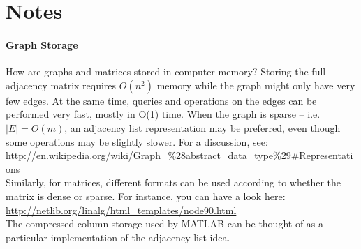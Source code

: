 \section{Notes}


\paragraph{Graph Storage} How are graphs and matrices stored in computer memory?
Storing the full adjacency matrix requires $O(n^2)$ memory while the graph might only have very few edges. At the same time, queries and operations on the edges can be performed very fast, mostly in O(1) time. When the graph is sparse -- i.e. $|E| = O(m)$, an adjacency list representation may be preferred, even though some operations may be slightly slower.  For a discussion, see:\\ \url{http://en.wikipedia.org/wiki/Graph_\%28abstract_data_type\%29#Representations} \\
Similarly, for matrices, different formats can be used according to whether the matrix is dense or sparse. For instance, you can have a look here:\\
\url{http://netlib.org/linalg/html_templates/node90.html}\\
The compressed column storage used by MATLAB can be thought of as a particular implementation of the adjacency list idea.





